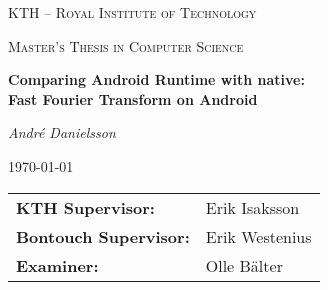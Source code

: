 \documentclass[a4paper, 12pt, notitlepage]{report}
\begin{document}

\def\thesistitle{\LARGE Comparing Android Runtime with native:\\ Fast Fourier Transform on Android}
\def\theauthor{André Danielsson}
\def\theschool{KTH -- Royal Institute of Technology}
\def\thedegree{Master's Thesis in Computer Science}
\def\thesupervisors{%
    \begin{tabular}{ll}
        \textbf{KTH Supervisor:} & Erik Isaksson\\
        \textbf{Bontouch Supervisor:} & Erik Westenius\\
        \textbf{Examiner:} & Olle Bälter
    \end{tabular}
}
\def\theabstract{}
\def\thedate{\today}
\def\thepreface{}
\def\thesweabstract{}

\begin{titlepage}
    \centering
    {\scshape\large\theschool\par}
    \vspace{1cm}
    {\scshape\normalsize\thedegree\par}
    \vspace{1.5cm}
    {\Large\bfseries\thesistitle\par}
    \vspace{1.5cm}
    {\large\itshape\theauthor\par}
    \vspace{1cm}
    {\large \today\par}

    \vfill

    {\large\thesupervisors\par}
    \vspace{1cm}
\end{titlepage}

\begin{abstract}
    
\end{abstract}
\end{document}
